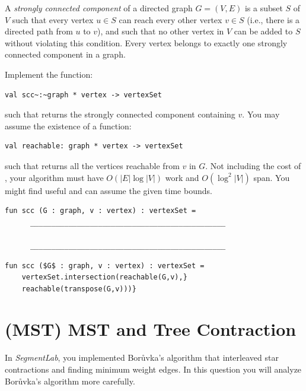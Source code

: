 \begin{problem}[10.]
A \emph{strongly connected component} of a directed graph $G = (V,E)$ is a subset $S$ of $V$ such
that every vertex $u \in S$ can reach every other vertex $v \in S$ (i.e.,
there is a directed path from $u$ to $v$), and such that no other vertex in
$V$ can be added to $S$ without violating this condition. Every vertex
belongs to exactly one strongly connected component{} in a graph.

\ask
Implement the function:
\begin{lstlisting}[language=caml,numbers=none]
val scc~:~graph * vertex -> vertexSet
\end{lstlisting}
such that  returns the strongly connected component{} containing $v$. You may assume
the existence of a function:
\begin{lstlisting}[language=caml,numbers=none]
val reachable: graph * vertex -> vertexSet
\end{lstlisting}
such that  returns all the vertices reachable from $v$
in $G$. Not including the cost of , your algorithm must
have $O(|E|\log|V|)$ work and $O(\log^2 |V|)$ span.  You might find
 useful and can assume the given time bounds.


\begin{lstlisting}[numbers=none]
fun scc (G : graph, v : vertex) : vertexSet = 
      ______________________________________________

      ______________________________________________
\end{lstlisting}

\sol
\begin{lstlisting}[language=caml,numbers=none]
fun scc ($G$ : graph, v : vertex) : vertexSet = 
    vertexSet.intersection(reachable(G,v),}
    reachable(transpose(G,v)))}
\end{lstlisting}

\end{problem}


\section{(MST) MST and Tree Contraction}

In \emph{SegmentLab}, you implemented Bor\r{u}vka's algorithm that
interleaved star contractions and finding minimum weight edges.  In
this question you will analyze Bor\r{u}vka's algorithm more carefully.

